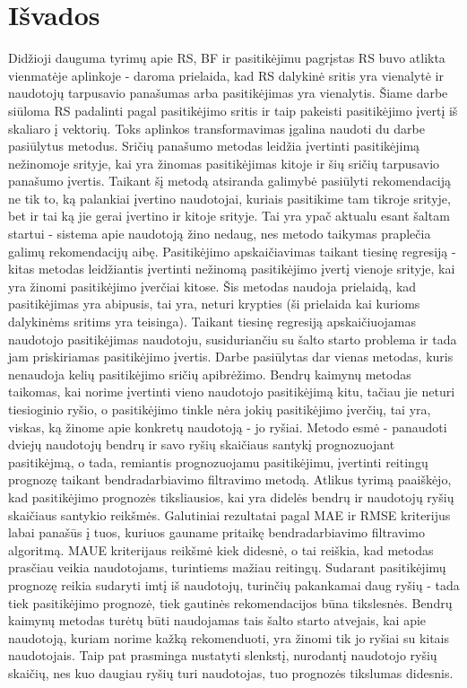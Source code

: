 \documentclass{VUMIFInfMagistrinis}
\begin{document}
\section{Išvados}
Didžioji dauguma tyrimų apie RS, BF ir pasitikėjimu pagrįstas RS buvo atlikta vienmatėje aplinkoje - daroma prielaida, kad RS dalykinė sritis yra vienalytė ir naudotojų tarpusavio panašumas arba pasitikėjimas yra vienalytis. Šiame darbe siūloma RS padalinti pagal pasitikėjimo sritis ir taip pakeisti pasitikėjimo įvertį iš skaliaro į vektorių. Toks aplinkos transformavimas įgalina naudoti du darbe pasiūlytus metodus.
\newline
\indent
Sričių panašumo metodas leidžia įvertinti pasitikėjimą nežinomoje srityje, kai yra žinomas pasitikėjimas kitoje ir šių sričių tarpusavio panašumo įvertis. Taikant šį metodą atsiranda galimybė pasiūlyti rekomendaciją ne tik to, ką palankiai įvertino naudotojai, kuriais pasitikime tam tikroje srityje, bet ir tai ką jie gerai įvertino ir kitoje srityje. Tai yra ypač aktualu esant šaltam startui - sistema apie naudotoją žino nedaug, nes metodo taikymas praplečia galimų rekomendacijų aibę.
\newline
\indent
Pasitikėjimo apskaičiavimas taikant tiesinę regresiją - kitas metodas leidžiantis įvertinti nežinomą pasitikėjimo įvertį vienoje srityje, kai yra žinomi pasitikėjimo įverčiai kitose. Šis metodas naudoja prielaidą, kad pasitikėjimas yra abipusis, tai yra, neturi krypties (ši prielaida kai kurioms dalykinėms sritims yra teisinga). Taikant tiesinę regresiją apskaičiuojamas naudotojo pasitikėjimas naudotoju, susiduriančiu su šalto starto problema ir tada jam priskiriamas pasitikėjimo įvertis.
\newline
\indent
Darbe pasiūlytas dar vienas metodas, kuris nenaudoja kelių pasitikėjimo sričių apibrėžimo. Bendrų kaimynų metodas taikomas, kai norime įvertinti vieno naudotojo pasitikėjimą kitu, tačiau jie neturi tiesioginio ryšio, o pasitikėjimo tinkle nėra jokių pasitikėjimo įverčių, tai yra, viskas, ką žinome apie konkretų naudotoją - jo ryšiai. Metodo esmė - panaudoti dviejų naudotojų bendrų ir savo ryšių skaičiaus santykį prognozuojant pasitikėjmą, o tada, remiantis prognozuojamu pasitikėjimu, įvertinti reitingų prognozę taikant bendradarbiavimo filtravimo metodą.
\newline
\indent
Atlikus tyrimą paaiškėjo, kad pasitikėjimo prognozės tiksliausios, kai yra didelės bendrų ir naudotojų ryšių skaičiaus santykio reikšmės. Galutiniai rezultatai pagal MAE ir RMSE kriterijus labai panašūs į tuos, kuriuos gauname pritaikę bendradarbiavimo filtravimo algoritmą. MAUE kriterijaus reikšmė kiek didesnė, o tai reiškia, kad metodas prasčiau veikia naudotojams, turintiems mažiau reitingų. Sudarant pasitikėjimų prognozę reikia sudaryti imtį iš naudotojų, turinčių pakankamai daug ryšių - tada tiek pasitikėjimo prognozė, tiek gautinės rekomendacijos būna tikslesnės. Bendrų kaimynų metodas turėtų būti naudojamas tais šalto starto atvejais, kai apie naudotoją, kuriam norime kažką rekomenduoti, yra žinomi tik jo ryšiai su kitais naudotojais. Taip pat prasminga nustatyti slenkstį, nurodantį naudotojo ryšių skaičių, nes kuo daugiau ryšių turi naudotojas, tuo prognozės tikslumas didesnis.
\end{document}
